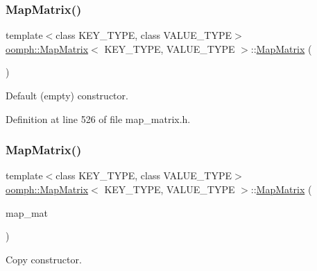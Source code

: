 \subsubsection{\texorpdfstring{Map\+Matrix()}{MapMatrix()}\hspace{0.1cm}{\footnotesize\ttfamily [1/2]}}
{\footnotesize\ttfamily template$<$class K\+E\+Y\+\_\+\+T\+Y\+PE, class V\+A\+L\+U\+E\+\_\+\+T\+Y\+PE$>$ \\
\hyperlink{classoomph_1_1MapMatrix}{oomph\+::\+Map\+Matrix}$<$ K\+E\+Y\+\_\+\+T\+Y\+PE, V\+A\+L\+U\+E\+\_\+\+T\+Y\+PE $>$\+::\hyperlink{classoomph_1_1MapMatrix}{Map\+Matrix} (\begin{DoxyParamCaption}{ }\end{DoxyParamCaption})\hspace{0.3cm}{\ttfamily [inline]}}



Default (empty) constructor. 



Definition at line 526 of file map\+\_\+matrix.\+h.

\mbox{\label{classoomph_1_1MapMatrix_ac58797d44964ccff957077b74076c231}} 
\subsubsection{\texorpdfstring{Map\+Matrix()}{MapMatrix()}\hspace{0.1cm}{\footnotesize\ttfamily [2/2]}}
{\footnotesize\ttfamily template$<$class K\+E\+Y\+\_\+\+T\+Y\+PE, class V\+A\+L\+U\+E\+\_\+\+T\+Y\+PE$>$ \\
\hyperlink{classoomph_1_1MapMatrix}{oomph\+::\+Map\+Matrix}$<$ K\+E\+Y\+\_\+\+T\+Y\+PE, V\+A\+L\+U\+E\+\_\+\+T\+Y\+PE $>$\+::\hyperlink{classoomph_1_1MapMatrix}{Map\+Matrix} (\begin{DoxyParamCaption}\item[{const \hyperlink{classoomph_1_1MapMatrix}{Map\+Matrix}$<$ K\+E\+Y\+\_\+\+T\+Y\+PE, V\+A\+L\+U\+E\+\_\+\+T\+Y\+PE $>$ \&}]{map\+\_\+mat }\end{DoxyParamCaption})\hspace{0.3cm}{\ttfamily [inline]}}



Copy constructor. 



